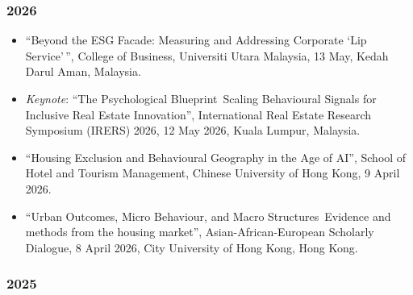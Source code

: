 \documentclass[11pt,a4paper]{article}
\providecommand{\tightlist}{%
  \setlength{\itemsep}{1pt}\setlength{\parskip}{0pt}}
\begin{document}
\subsubsection{2026}\label{section-19}

\begin{itemize}
\tightlist
\item
  ``Beyond the ESG Facade: Measuring and Addressing Corporate `Lip
  Service'\,'', College of Business, Universiti Utara Malaysia, 13 May,
  Kedah Darul Aman, Malaysia.
\item
  \emph{Keynote}: ``The Psychological Blueprint~Scaling Behavioural
  Signals for Inclusive Real Estate Innovation'', International Real
  Estate Research Symposium (IRERS) 2026, 12 May 2026, Kuala Lumpur,
  Malaysia.
\item
  ``Housing Exclusion and Behavioural Geography in the Age of AI'',
  School of Hotel and Tourism Management, Chinese University of Hong
  Kong, 9 April 2026.
\item
  ``Urban Outcomes, Micro Behaviour, and Macro Structures~Evidence and
  methods from the housing market'', Asian-African-European Scholarly
  Dialogue, 8 April 2026, City University of Hong Kong, Hong Kong.
\end{itemize}

\subsubsection{2025}\label{section-20}
\end{document}

